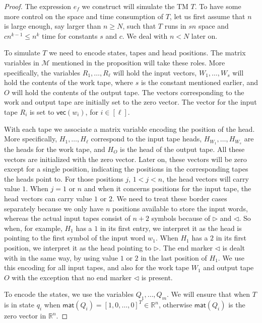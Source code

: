 \begin{proof}
	The expression $e_f$ we construct will simulate the TM $T$. To have some more control on the space 
	and time consumption of $T$, let us first assume that $n$ is large enough, say larger than $n\geq N$, 
	such that $T$ runs in $sn$ space and $cn^{k-1}\leq n^k$ time for constants $s$ and $c$. We deal with $n<N$ later on.

    To simulate $T$ we need to encode states, tapes and head positions. The matrix variables in 
    $\mathcal{M}$ mentioned in the proposition will take these roles. More specifically, the variables 
    $R_1,\ldots,R_\ell$ will hold the input vectors, $W_1,\ldots,W_s$ will hold the contents of the work
    tape, where $s$ is the constant mentioned earlier, and $O$ will hold the contents of the output tape. 
    The vectors corresponding to the work and output tape are initially set to the zero vector. 
    The vector for the input tape $R_i$ is set to $\mathsf{vec}(w_i)$, for $i\in[\ell]$.

    With each tape we associate a matrix variable encoding the position of the head. More specifically, 
    $H_1,\ldots,H_\ell$ correspond to the input tape heads,
    $H_{W_1},\ldots, H_{W_s}$ are the heads for the work tape, and $H_O$ is the head of the output tape. 
    All these vectors are initialized with the zero vector. Later on, these vectors will be zero except 
    for a single position, indicating the positions in the corresponding tapes the heads point to. 
    For those positions $j$, $1<j<n$, the head vectors will carry value $1$.  When $j=1$ or $n$ and when 
    it concerns positions for the input tape, the head vectors can carry value $1$ or $2$. We need to treat 
    these border cases separately
    because we only have $n$ positions available to store the input words, whereas the actual input tapes 
    consist of $n+2$ symbols because of $\rhd$ and $\lhd$. So when, for example, $H_1$ has a $1$ in its first
    entry, we interpret it as the head is pointing to the first symbol of the input word $w_1$. When $H_1$
    has a $2$ in its first position, we interpret it as the head pointing to $\rhd$. The end marker $\lhd$ is
    dealt with in the same way, by using value $1$ or $2$ in the last position of $H_1$. We use this encoding
    for all input tapes, and also for the work tape $W_1$ and output tape $O$ with the exception that no end 
    marker $\lhd$ is present.


    To encode the states, we use the variables $Q_1,\ldots,Q_m$. We will ensure that when $T$ is in state 
    $q_i$ when
    $\mathsf{mat}(Q_i)=[1,0,\ldots,0]^T\in\mathbb{R}^n$, otherwise $\mathsf{mat}(Q_i)$ is the zero 
    vector in $\mathbb{R}^n$.	


\end{proof}
